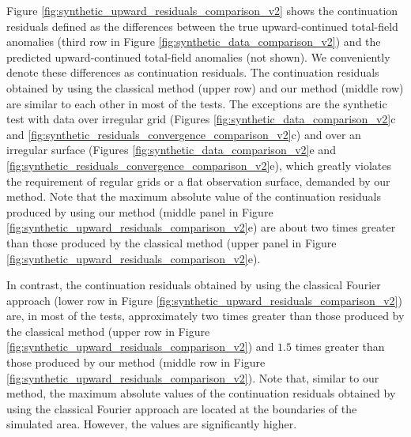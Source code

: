 \documentclass[manuscript,noblind]{geophysics}
\begin{document}
Figure \ref{fig:synthetic_upward_residuals_comparison_v2} shows the continuation residuals defined as the differences
between the true upward-continued total-field anomalies (third row in Figure
\ref{fig:synthetic_data_comparison_v2}) and the predicted upward-continued total-field 
anomalies (not shown). We conveniently denote these differences as continuation
residuals.
The continuation residuals 
obtained by using the classical method (upper row) and our method (middle row) are 
similar to each other in most of the tests.
The exceptions are the synthetic test with data over irregular grid (Figures \ref{fig:synthetic_data_comparison_v2}c and \ref{fig:synthetic_residuals_convergence_comparison_v2}c) and over an irregular surface 
(Figures \ref{fig:synthetic_data_comparison_v2}e and 
\ref{fig:synthetic_residuals_convergence_comparison_v2}e), which greatly violates the 
requirement of regular grids or a flat observation surface, demanded by our method.
Note that the maximum absolute value of the continuation residuals produced by using our 
method (middle panel in Figure \ref{fig:synthetic_upward_residuals_comparison_v2}e) 
are about two times greater than those produced by the classical method 
(upper panel in Figure \ref{fig:synthetic_upward_residuals_comparison_v2}e).

In contrast, the continuation residuals obtained by using the 
classical Fourier approach (lower row in Figure \ref{fig:synthetic_upward_residuals_comparison_v2})
are, in most of the tests, approximately two times greater than those produced by the classical method 
(upper row in Figure \ref{fig:synthetic_upward_residuals_comparison_v2}) and $1.5$ times greater than
those produced by our method (middle row in Figure \ref{fig:synthetic_upward_residuals_comparison_v2}).
Note that, similar to our method, the maximum absolute values of the continuation residuals 
obtained by using the classical Fourier approach are located at the boundaries of the simulated area.
However, the values are significantly higher.
\end{document}
